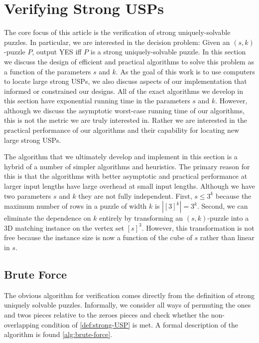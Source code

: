 \documentclass[11pt]{article}
\begin{document}
\section{Verifying Strong USPs}
\label{sec:verify}

The core focus of this article is the verification of strong
uniquely-solvable puzzles.  In particular, we are interested in the
decision problem: Given an $(s,k)$-puzzle $P$, output YES iff $P$ is a
strong uniquely-solvable puzzle.  In this section we discuss the
design of efficient and practical algorithms to solve this problem as
a function of the parameters $s$ and $k$.  As the goal of this work is
to use computers to locate large strong USPs, we also discuss aspects
of our implementation that informed or constrained our designs.  All
of the exact algorithms we develop in this section have exponential
running time in the parameters $s$ and $k$.  However, although we
discuss the asymptotic worst-case running time of our algorithms, this
is not the metric we are truly interested in.  Rather we are
interested in the practical performance of our algorithms and their
capability for locating new large strong USPs.

The algorithm that we ultimately develop and implement in this section
is a hybrid of a number of simpler algorithms and heuristics.  The
primary reason for this is that the algorithms with better asymptotic
and practical performance at larger input lengths have large overhead
at small input lengths.  Although we have two parameters $s$ and $k$
they are not fully independent.  First, $s \le 3^k$ because the
maximum number of rows in a puzzle of width $k$ is $|[3]^k| = 3^k$.
Second, we can eliminate the dependence on $k$ entirely by
transforming an $(s,k)$-puzzle into a 3D matching instance on the
vertex set $[s]^3$.  However, this transformation is not free because
the instance size is now a function of the cube of $s$ rather than
linear in $s$.

\subsection{Brute Force}

The obvious algorithm for verification comes directly from the
definition of strong uniquely solvable puzzles.  Informally, we
consider all ways of permuting the ones and twos pieces relative to
the zeroes pieces and check whether the non-overlapping condition of
\autoref{def:strong-USP} is met.  A formal description of the
algorithm is found \autoref{alg:brute-force}.
\end{document}
